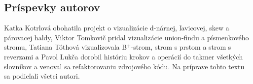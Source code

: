 \subsection{Príspevky autorov}
Katka Kotrlová obohatila projekt o vizualizácie d-nárnej, ľavicovej, skew a
párovacej haldy, Viktor Tomkovič pridal vizualizácie union-findu a písmenkového
stromu, Tatiana Tóthová vizualizovala B$^+$-strom, strom s prstom a strom s
reverzami a Pavol Lukča dorobil históriu
krokov a operácií do takmer všetkých slovníkov a venoval sa refaktorovaniu
zdrojového kódu. Na príprave tohto textu sa podieľali všetci autori.

